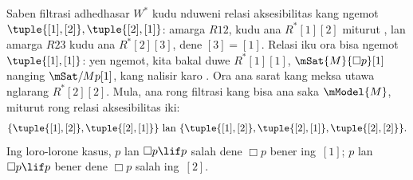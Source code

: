 \documentclass[../../../include/open-logic-section]{subfiles}
\begin{document}
\begin{ex}
  Saben filtrasi adhedhasar $W^*$ kudu nduweni relasi aksesibilitas
  kang ngemot $\tuple{[1], [2]}, \tuple{[2],[1]}$: amarga $R12$,
  kudu ana $R^*[1][2]$ miturut
  , lan
  amarga $R23$ kudu ana $R^*[2][3]$, dene $[3]=[1]$. Relasi iku ora
  bisa ngemot $\tuple{[1],[1]}$: yen ngemot, kita bakal duwe
  $R^*[1][1]$, $\mSat{M}{\Box p}[1]$ nanging
  $\mSat/{M}{p}[1]$, kang nalisir karo
  . Ora ana sarat kang meksa utawa
  nglarang $R^*[2][2]$. Mula, ana rong filtrasi kang bisa ana saka
  $\mModel{M}$, miturut rong relasi aksesibilitas iki:
  \[
  \{\tuple{[1],[2]}, \tuple{[2],[1]}\} \text{ lan }
  \{\tuple{[1],[2]}, \tuple{[2],[1]}, \tuple{[2],[2]}\}.
  \]
  Ing loro-lorone kasus, $p$ lan $\Box p \lif p$ salah dene $\Box p$
  bener ing~$[1]$; $p$ lan $\Box p \lif p$ bener dene $\Box p$ salah
  ing~$[2]$.
\end{ex}
\end{document}
